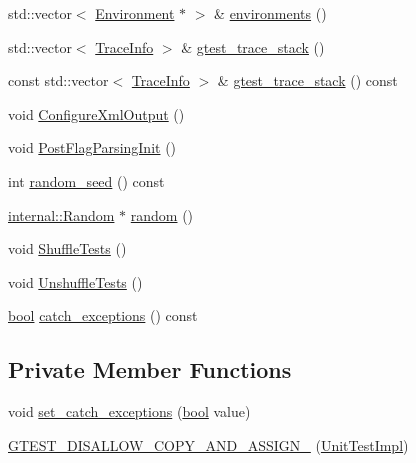 \begin{DoxyCompactItemize}
std\+::vector$<$ \hyperlink{classtesting_1_1Environment}{Environment} $\ast$ $>$ \& \hyperlink{classtesting_1_1internal_1_1UnitTestImpl_aa1489e6a2378d64d68bc01963ea5db4a}{environments} ()
\item 
std\+::vector$<$ \hyperlink{structtesting_1_1internal_1_1TraceInfo}{Trace\+Info} $>$ \& \hyperlink{classtesting_1_1internal_1_1UnitTestImpl_af8c7c0a0c954e36d83e6e4690d3fb938}{gtest\+\_\+trace\+\_\+stack} ()
\item 
const std\+::vector$<$ \hyperlink{structtesting_1_1internal_1_1TraceInfo}{Trace\+Info} $>$ \& \hyperlink{classtesting_1_1internal_1_1UnitTestImpl_ad82fed50f13f13f11867af9dad4a2cf6}{gtest\+\_\+trace\+\_\+stack} () const
\item 
void \hyperlink{classtesting_1_1internal_1_1UnitTestImpl_a21cd7b2928de03a55b5252f29dd5ae6d}{Configure\+Xml\+Output} ()
\item 
void \hyperlink{classtesting_1_1internal_1_1UnitTestImpl_a772894193104b1b2516f16e6ff813168}{Post\+Flag\+Parsing\+Init} ()
\item 
int \hyperlink{classtesting_1_1internal_1_1UnitTestImpl_a625b9fb6d17b008c44fc902255e6343c}{random\+\_\+seed} () const
\item 
\hyperlink{classtesting_1_1internal_1_1Random}{internal\+::\+Random} $\ast$ \hyperlink{classtesting_1_1internal_1_1UnitTestImpl_ab3b45b5eb4d583219a3602011ea44347}{random} ()
\item 
void \hyperlink{classtesting_1_1internal_1_1UnitTestImpl_aaaa38e6a4372e6bb9bbe3143a3a32b65}{Shuffle\+Tests} ()
\item 
void \hyperlink{classtesting_1_1internal_1_1UnitTestImpl_a1ee7db3bf8284dd9dce4dc857564bce3}{Unshuffle\+Tests} ()
\item 
\hyperlink{classbool}{bool} \hyperlink{classtesting_1_1internal_1_1UnitTestImpl_aa311b980783a9cfb547831f7b19e3f3a}{catch\+\_\+exceptions} () const
\end{DoxyCompactItemize}
\subsection*{Private Member Functions}
\begin{DoxyCompactItemize}
\item 
void \hyperlink{classtesting_1_1internal_1_1UnitTestImpl_aefec23506cd772c3abc536cda301d926}{set\+\_\+catch\+\_\+exceptions} (\hyperlink{classbool}{bool} value)
\item 
\hyperlink{classtesting_1_1internal_1_1UnitTestImpl_a9c8a7b2571705040ead6a61645278e18}{G\+T\+E\+S\+T\+\_\+\+D\+I\+S\+A\+L\+L\+O\+W\+\_\+\+C\+O\+P\+Y\+\_\+\+A\+N\+D\+\_\+\+A\+S\+S\+I\+G\+N\+\_\+} (\hyperlink{classtesting_1_1internal_1_1UnitTestImpl}{Unit\+Test\+Impl})
\end{DoxyCompactItemize}
